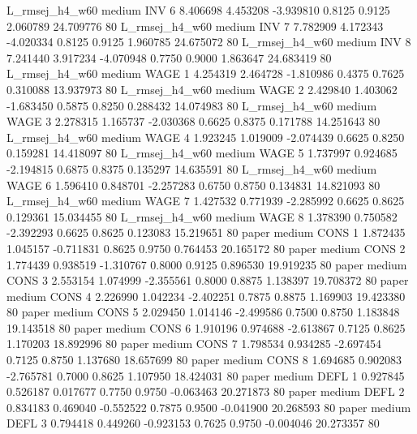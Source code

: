 L_rmsej_h4_w60     medium      INV                 6  8.406698 4.453208 -3.939810 0.8125 0.9125  2.060789   24.709776 80
L_rmsej_h4_w60     medium      INV                 7  7.782909 4.172343 -4.020334 0.8125 0.9125  1.960785   24.675072 80
L_rmsej_h4_w60     medium      INV                 8  7.241440 3.917234 -4.070948 0.7750 0.9000  1.863647   24.683419 80
L_rmsej_h4_w60     medium     WAGE                 1  4.254319 2.464728 -1.810986 0.4375 0.7625  0.310088   13.937973 80
L_rmsej_h4_w60     medium     WAGE                 2  2.429840 1.403062 -1.683450 0.5875 0.8250  0.288432   14.074983 80
L_rmsej_h4_w60     medium     WAGE                 3  2.278315 1.165737 -2.030368 0.6625 0.8375  0.171788   14.251643 80
L_rmsej_h4_w60     medium     WAGE                 4  1.923245 1.019009 -2.074439 0.6625 0.8250  0.159281   14.418097 80
L_rmsej_h4_w60     medium     WAGE                 5  1.737997 0.924685 -2.194815 0.6875 0.8375  0.135297   14.635591 80
L_rmsej_h4_w60     medium     WAGE                 6  1.596410 0.848701 -2.257283 0.6750 0.8750  0.134831   14.821093 80
L_rmsej_h4_w60     medium     WAGE                 7  1.427532 0.771939 -2.285992 0.6625 0.8625  0.129361   15.034455 80
L_rmsej_h4_w60     medium     WAGE                 8  1.378390 0.750582 -2.392293 0.6625 0.8625  0.123083   15.219651 80
         paper     medium     CONS                 1  1.872435 1.045157 -0.711831 0.8625 0.9750  0.764453   20.165172 80
         paper     medium     CONS                 2  1.774439 0.938519 -1.310767 0.8000 0.9125  0.896530   19.919235 80
         paper     medium     CONS                 3  2.553154 1.074999 -2.355561 0.8000 0.8875  1.138397   19.708372 80
         paper     medium     CONS                 4  2.226990 1.042234 -2.402251 0.7875 0.8875  1.169903   19.423380 80
         paper     medium     CONS                 5  2.029450 1.014146 -2.499586 0.7500 0.8750  1.183848   19.143518 80
         paper     medium     CONS                 6  1.910196 0.974688 -2.613867 0.7125 0.8625  1.170203   18.892996 80
         paper     medium     CONS                 7  1.798534 0.934285 -2.697454 0.7125 0.8750  1.137680   18.657699 80
         paper     medium     CONS                 8  1.694685 0.902083 -2.765781 0.7000 0.8625  1.107950   18.424031 80
         paper     medium     DEFL                 1  0.927845 0.526187  0.017677 0.7750 0.9750 -0.063463   20.271873 80
         paper     medium     DEFL                 2  0.834183 0.469040 -0.552522 0.7875 0.9500 -0.041900   20.268593 80
         paper     medium     DEFL                 3  0.794418 0.449260 -0.923153 0.7625 0.9750 -0.004046   20.273357 80
